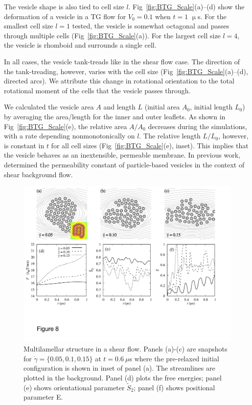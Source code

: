 \documentclass[prb,preprint,showpacs,preprintnumbers,amsmath,amssymb,longbibliography]{revtex4-1}
\begin{document}
The vesicle shape is also tied to cell size $l$.  
Fig~\ref{fig:BTG_Scale}(a)--(d) show the deformation of a vesicle in a
TG flow for $V_0=0.1$ when $t = 1$ $\upmu$s.  
For the smallest cell size $l = 1$ tested, the vesicle is somewhat octagonal
and passes through multiple cells (Fig~\ref{fig:BTG_Scale}(a)).
For the largest cell size $l = 4$,
the vesicle is rhomboid and surrounds a single cell. 

In all cases, the vesicle tank-treads like in the shear flow case.
The direction of the tank-treading, however, varies with the cell
size (Fig~\ref{fig:BTG_Scale}(a)--(d), directed arcs).  We attribute
this change in rotational orientation to the total rotational moment
of the cells that the vesicle passes through.

We calculated the vesicle area $A$ and length $L$ (initial area $A_0$, initial length $L_0$)
by averaging the area/length for the inner and outer leaflets.  
As shown in Fig~\ref{fig:BTG_Scale}(e),
the relative area $A/A_0$ decreases during the simulations, with a rate
depending nonmonotonically on $l$.  
The relative length $L/L_0$, however, is constant in $t$ for all cell sizes (Fig~\ref{fig:BTG_Scale}(e), inset).
This implies that the vesicle behaves as an inextensible, permeable membrane.
In previous work, \cite{Fu2022_JFM} determined the permeability constant of particle-based vesicles
in the context of shear background flow\cite{chabanon2017,qua-gan-you2021}.



\begin{figure}
  \begin{center}
\includegraphics[width=1.0\textwidth]{Figures/Figure8.pdf}
  \end{center}
  \vspace{-20pt}  
  \caption{\label{fig:BC2_shear}
Multilamellar structure in a shear flow. Panels (a)-(c) are snapshots for $\dot \gamma = \{0.05, 0.1, 0.15\}$ at $t=0.6\ \mu$s where the pre-relaxed initial configuration is shown in inset of panel (a). The streamlines are plotted in the background.
Panel (d) plots the free energies; panel (e) shows orientational parameter $\tilde{S}_2$; panel (f) shows positional parameter E.
       }
\end{figure}
\end{document}
